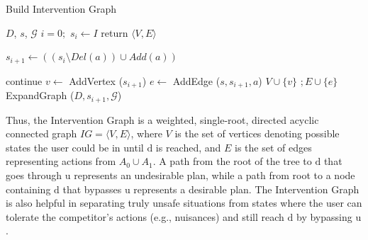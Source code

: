 \documentclass[letterpaper]{article}
\theoremstyle{plain}
\begin{document}
\begin{algorithm}[tb]
        \caption{Build Intervention Graph}
        \label{bsg}
        \begin{algorithmic}[1]
                \Require $D$, $s$, $\mathcal{G}$
                \State $i=0;$ $ s_{i} \gets I $
                 return $\langle V,E\rangle$
                \Else
                                \State \parbox[t]{0.95\linewidth} 
                                {$s_{i+1} \gets ((s_{i} \setminus Del(a))\cup Add(a))$}
                                 continue \EndIf
                                \State $v \gets$ AddVertex ($s_{i+1}$)
                                \State $e \gets$ AddEdge ($s, s_{i+1}, a$)
                                \State $V \cup \{v\}$ $; E \cup \{e\}$
                                \State ExpandGraph ($D, s_{i+1}, \mathcal{G}$)
                        \EndFor
                \EndIf  
                \EndProcedure
        \end{algorithmic}
\end{algorithm}

Thus, the Intervention Graph is a weighted, single-root, directed acyclic connected graph $IG= \langle V,E \rangle$, where $V$ is the set of vertices denoting possible states the user could be in until $\mathrm{d}$ is reached, and $E$ is the set of edges representing actions from $A_0 \cup A_{1}$. A path from the root of the tree to $\mathrm{d}$ that goes through $\mathrm{u}$ represents an undesirable plan, while a path from root to a node containing $\mathrm{d}$ that bypasses $\mathrm{u}$ represents a desirable plan. The Intervention Graph is also helpful in separating truly unsafe situations from states where the user can tolerate the competitor's actions (e.g., nuisances) and still reach $\mathrm{d}$ by bypassing $\mathrm{u}$. 

\end{document}
